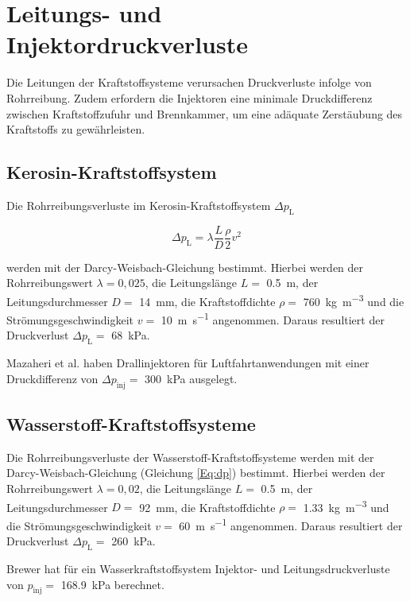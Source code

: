\section{Leitungs- und Injektordruckverluste}

Die Leitungen der Kraftstoffsysteme verursachen Druckverluste infolge von Rohrreibung. Zudem erfordern die Injektoren eine minimale Druckdifferenz zwischen Kraftstoffzufuhr und Brennkammer, um eine adäquate Zerstäubung des Kraftstoffs zu gewährleisten.

\subsection{Kerosin-Kraftstoffsystem}

Die Rohrreibungsverluste im Kerosin-Kraftstoffsystem $\Delta p_\mathrm{L}$ 

\begin{equation}\label{Eq:dp}
	\Delta p_\mathrm{L}=\lambda\frac{L}{D}\frac{\rho}{2}v^2
\end{equation}

werden mit der Darcy-Weisbach-Gleichung bestimmt. Hierbei werden der Rohrreibungswert $\lambda=0,025$, die Leitungslänge $L=$ \SI{0.5}{\m}, der Leitungsdurchmesser $D=$ \SI{14}{\milli\m}, die Kraftstoffdichte $\rho=$ \SI{760}{\kg\per\m\cubed} und die Strömungsgeschwindigkeit $v=$ \SI{10}{\m\per\s} angenommen. Daraus resultiert der Druckverlust $\Delta p_\mathrm{L}=$ \SI{68}{\kilo\Pa}. 

Mazaheri et al. \cite{Mazaheri.2012} haben Drallinjektoren für Luftfahrtanwendungen mit einer Druckdifferenz von $\Delta p_{\mathrm{inj}}=$ \SI{300}{\kilo\Pa} ausgelegt.

\subsection{Wasserstoff-Kraftstoffsysteme}

Die Rohrreibungsverluste der Wasserstoff-Kraftstoffsysteme werden mit der Darcy-Weisbach-Gleichung (Gleichung \ref{Eq:dp}) bestimmt. Hierbei werden der Rohrreibungswert $\lambda=0,02$, die Leitungslänge $L=$ \SI{0.5}{\m}, der Leitungsdurchmesser $D=$ \SI{92}{\milli\m}, die Kraftstoffdichte $\rho=$ \SI{1.33}{\kg\per\m\cubed} und die Strömungsgeschwindigkeit $v=$ \SI{60}{\m\per\s} angenommen. Daraus resultiert der Druckverlust $\Delta p_\mathrm{L}=$ \SI{260}{\kilo\Pa}. 


Brewer \cite{Brewer.1991} hat für ein Wasserkraftstoffsystem Injektor- und Leitungsdruckverluste von $p_{\mathrm{inj}}=$ \SI{168.9}{\kilo\Pa} berechnet.

